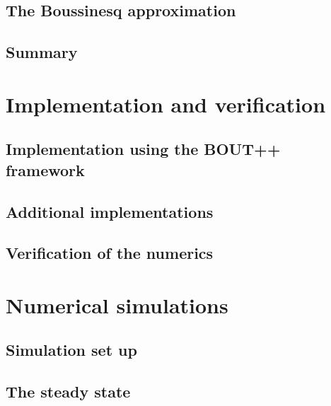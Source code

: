 \documentclass[12pt,a4paper,oneside,openright]{report} %
\begin{document}
\chapter{The Boussinesq approximation}
\label{chap:boussinesq}

\chapter{Summary}


\part{Implementation and verification}
\label{part:impl}
\chapter{Implementation using the BOUT++ framework}
\label{chap:implBOUT++}




\chapter{Additional implementations}
\label{chap:additionalImplementation}






\chapter{Verification of the numerics}
\label{chap:verification}


\part{Numerical simulations}
\label{part:results}
\chapter{Simulation set up}
\label{chap:setup}

\chapter{The steady state}
\label{chap:ss}

\end{document}
